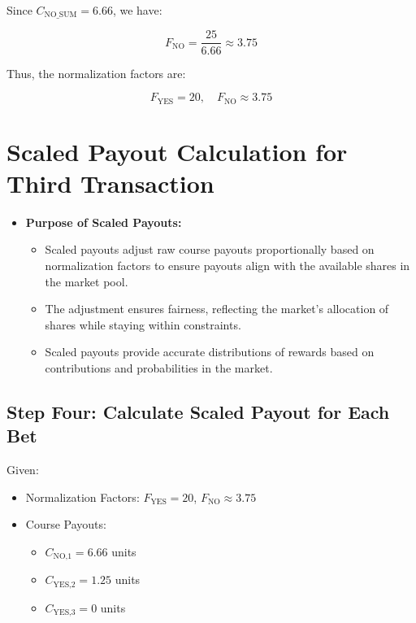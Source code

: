 \documentclass{article}
\begin{document}
Since \( C_{\text{NO\_SUM}} = 6.66 \), we have:

\[
F_{\text{NO}} = \frac{25}{6.66} \approx 3.75
\]

Thus, the normalization factors are:

\[
F_{\text{YES}} = 20, \quad F_{\text{NO}} \approx 3.75
\]

\begin{center}
\end{center}

\newpage


\section*{Scaled Payout Calculation for Third Transaction}

\begin{itemize}
    \item \textbf{Purpose of Scaled Payouts:}
    \begin{itemize}
        \item Scaled payouts adjust raw course payouts proportionally based on normalization factors to ensure payouts align with the available shares in the market pool.
        \item The adjustment ensures fairness, reflecting the market's allocation of shares while staying within constraints.
        \item Scaled payouts provide accurate distributions of rewards based on contributions and probabilities in the market.
    \end{itemize}
\end{itemize}

\subsection*{Step Four: Calculate Scaled Payout for Each Bet}

Given:
\begin{itemize}
    \item Normalization Factors: \( F_{\text{YES}} = 20 \), \( F_{\text{NO}} \approx 3.75 \)
    \item Course Payouts:
    \begin{itemize}
        \item \( C_{\text{NO,1}} = 6.66 \) units
        \item \( C_{\text{YES,2}} = 1.25 \) units
        \item \( C_{\text{YES,3}} = 0 \) units
    \end{itemize}
\end{itemize}
\end{document}
